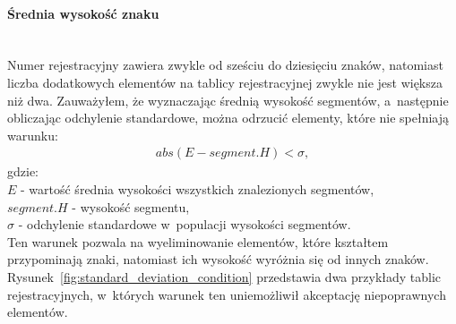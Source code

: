 \paragraph{Średnia wysokość znaku}\mbox{}\\
Numer rejestracyjny zawiera zwykle od sześciu do dziesięciu znaków, natomiast liczba dodatkowych elementów na tablicy rejestracyjnej zwykle nie jest większa niż dwa. Zauważyłem, że wyznaczając średnią wysokość segmentów, a~następnie obliczając odchylenie standardowe, można odrzucić elementy, które nie spełniają warunku:
\begin{gather*}
  abs(E-segment.H) < \sigma,
\end{gather*}
gdzie:\\
$E$ - wartość średnia wysokości wszystkich znalezionych segmentów, \\
$segment.H$ - wysokość segmentu,\\
$\sigma$ - odchylenie standardowe w~populacji wysokości segmentów.\\
Ten warunek pozwala na wyeliminowanie elementów, które kształtem przypominają znaki, natomiast ich wysokość wyróżnia się od innych znaków. Rysunek~\ref{fig:standard_deviation_condition} przedstawia dwa przykłady tablic rejestracyjnych, w~których warunek ten uniemożliwił akceptację niepoprawnych elementów.
